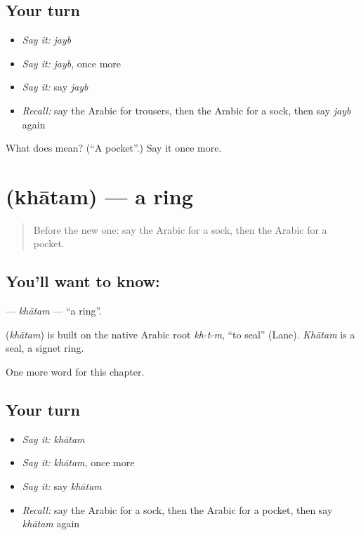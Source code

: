 \subsection*{Your turn}
\begin{itemize}
\raggedright
  \item \emph{Say it:} \emph{jayb}
  \item \emph{Say it:} \emph{jayb}, once more
  \item \emph{Say it:} say \emph{jayb}
  \item \emph{Recall:} say the Arabic for trousers, then the Arabic for a sock, then say \emph{jayb} again
\end{itemize}

\begin{tcolorbox}[breakable,colback=teal!4,colframe=teal!35!black,title={Before you move on}]
What does  mean? (\textquotedblleft{}A pocket\textquotedblright{}.) Say it once more.
\end{tcolorbox}
\section[\texorpdfstring{\ar{خاتم} (khātam)}{خاتم (khātam)}]{ (khātam) — a ring}

\label{lesson:AR-C95-khatam}



\begin{quote}
Before the new one: say the Arabic for a sock, then the Arabic for a pocket.
\end{quote}

\subsection*{You'll want to know: }
\textbf{} — \emph{khātam} — \textquotedblleft{}a ring\textquotedblright{}.

\begin{cousinweb}
\textbf{} (\emph{khātam}) is built on the native Arabic root \emph{kh-t-m}, \textquotedblleft{}to seal\textquotedblright{} (Lane). \emph{Khātam} is a seal, a signet ring.
\end{cousinweb}

\begin{grammarlens}[title={What you've built}]
One more word for this chapter.
\end{grammarlens}

\subsection*{Your turn}
\begin{itemize}
\raggedright
  \item \emph{Say it:} \emph{khātam}
  \item \emph{Say it:} \emph{khātam}, once more
  \item \emph{Say it:} say \emph{khātam}
  \item \emph{Recall:} say the Arabic for a sock, then the Arabic for a pocket, then say \emph{khātam} again
\end{itemize}

